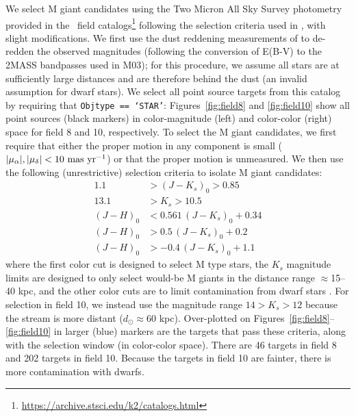 \documentclass[letterpaper,12pt,preprint]{hack_aastex}
\begin{document}
We select M giant candidates using the Two Micron All Sky Survey \citep[2MASS; ][]{Skrutskie:2006} photometry provided in the \KT\ field catalogs\footnote{\url{https://archive.stsci.edu/k2/catalogs.html}} following the selection criteria used in \cite[][hereafter M03]{Majewski:2003}, with slight modifications. We first use the dust reddening measurements of \cite{Schlafly:2011} to de-redden the observed magnitudes (following the conversion of E(B-V) to the 2MASS bandpasses used in M03); for this procedure, we assume all stars are at sufficiently large distances and are therefore behind the dust (an invalid assumption for dwarf stars). We select all point source targets from this catalog by requiring that \texttt{Objtype == `STAR'}: Figures~\ref{fig:field8} and \ref{fig:field10} show all point sources (black markers) in color-magnitude (left) and color-color (right) space for field 8 and 10, respectively. To select the M giant candidates, we first require that either the proper motion in any component is small ($|\mu_\alpha |,|\mu_\delta | < 10~{\rm mas}~{\rm yr}^{-1}$) or that the proper motion is unmeasured. We then use the following (unrestrictive) selection criteria to isolate M giant candidates:
\begin{align} %
	1.1 &> (J-K_s)_0 > 0.85 \\
	13.1 &> K_s > 10.5\\
	(J-H)_0 &< 0.561\,(J-K_s)_0 + 0.34\\
	(J-H)_0 &> 0.5\,(J-K_s)_0 + 0.2\\
	(J-H)_0 &> -0.4\,(J-K_s)_0 + 1.1
\end{align}
where the first color cut is designed to select M type stars, the $K_s$ magnitude limits are designed to only select would-be M giants in the distance range $\approx$15--40 kpc, and the other color cuts are to limit contamination from dwarf stars \citep[e.g.,][]{Majewski:2003}. For selection in field 10, we instead use the magnitude range $14 > K_s > 12$ because the stream is more distant ($d_\odot \approx 60$ kpc). Over-plotted on Figures~\ref{fig:field8}--\ref{fig:field10} in larger (blue) markers are the targets that pass these criteria, along with the selection window (in color-color space). There are 46 targets in field 8 and 202 targets in field 10. Because the targets in field 10 are fainter, there is more contamination with dwarfs.
\end{document}
